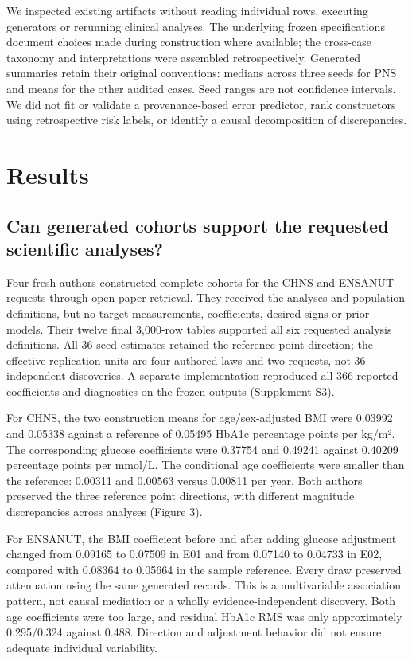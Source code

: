 \documentclass[11pt,letterpaper]{article}
\begin{document}
We inspected existing artifacts without reading individual rows, executing generators or rerunning clinical analyses. The underlying frozen specifications document choices made during construction where available; the cross-case taxonomy and interpretations were assembled retrospectively. Generated summaries retain their original conventions: medians across three seeds for PNS and means for the other audited cases. Seed ranges are not confidence intervals. We did not fit or validate a provenance-based error predictor, rank constructors using retrospective risk labels, or identify a causal decomposition of discrepancies.


\section{Results}

\subsection{Can generated cohorts support the requested scientific analyses?}

Four fresh authors constructed complete cohorts for the CHNS and ENSANUT requests through open paper retrieval. They received the analyses and population definitions, but no target measurements, coefficients, desired signs or prior models. Their twelve final 3,000-row tables supported all six requested analysis definitions. All 36 seed estimates retained the reference point direction; the effective replication units are four authored laws and two requests, not 36 independent discoveries. A separate implementation reproduced all 366 reported coefficients and diagnostics on the frozen outputs (Supplement S3).


For CHNS, the two construction means for age/\allowbreak{}sex-adjusted BMI were 0.03992 and 0.05338 against a reference of 0.05495 HbA1c percentage points per kg/\allowbreak{}m². The corresponding glucose coefficients were 0.37754 and 0.49241 against 0.40209 percentage points per mmol/\allowbreak{}L. The conditional age coefficients were smaller than the reference: 0.00311 and 0.00563 versus 0.00811 per year. Both authors preserved the three reference point directions, with different magnitude discrepancies across analyses (Figure 3).


For ENSANUT, the BMI coefficient before and after adding glucose adjustment changed from 0.09165 to 0.07509 in E01 and from 0.07140 to 0.04733 in E02, compared with 0.08364 to 0.05664 in the sample reference. Every draw preserved attenuation using the same generated records. This is a multivariable association pattern, not causal mediation or a wholly evidence-independent discovery. Both age coefficients were too large, and residual HbA1c RMS was only approximately 0.295/\allowbreak{}0.324 against 0.488. Direction and adjustment behavior did not ensure adequate individual variability.
\end{document}

